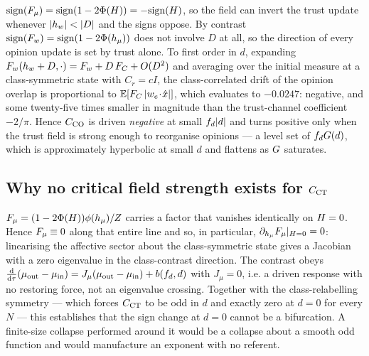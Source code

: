 $\mathrm{sign}(F_{\mu})=\mathrm{sign}(1-2\Phi(H))=-\mathrm{sign}(H)$, so the
field can invert the trust update whenever $|\hw|<|D|$ and the signs oppose. By
contrast $\mathrm{sign}(F_{w})=\mathrm{sign}(1-2\Phi(h_{\mu}))$ does not involve $D$
at all, so the direction of every opinion update is set by trust alone. To first
order in $d$, expanding $F_{w}(h_{w}+D,\cdot)=F_{w}+D\,F_{C}+O(D^2)$ and averaging over
the initial measure at a class-symmetric state with $C_r=cI$, the
class-correlated drift of the opinion overlap is proportional to
$\mathbb{E}[F_{C}\,|w_e\!\cdot\!\hat{x}|]$, which evaluates to $-0.0247$: negative,
and some twenty-five times smaller in magnitude than the trust-channel
coefficient $-2/\pi$. Hence $C_{\mathrm{CO}}$ is driven \emph{negative} at small $f_{d}|d|$ and
turns positive only when the trust field is strong enough to reorganise opinions
--- a level set of $f_{d}G(d)$, which is approximately hyperbolic at small $d$
and flattens as $G$ saturates.

\subsection{Why no critical field strength exists for $C_{\mathrm{CT}}$}
\label{app:no-critical}

$F_{\mu}=(1-2\Phi(H))\phi(h_{\mu})/Z$ carries a factor that vanishes identically on
$H=0$. Hence $F_{\mu}\equiv0$ along that entire line and so, in particular,
$\partial_{h_{\mu}}F_{\mu}|_{H=0}=0$: linearising the affective sector about the
class-symmetric state gives a Jacobian with a zero eigenvalue in the
class-contrast direction. The contrast obeys
$\tfrac{\mathrm{d}}{\mathrm{d}\tau}(\mu_{\text{out}}-\mu_{\text{in}}) =
J_\mu(\mu_{\text{out}}-\mu_{\text{in}}) + b(f_{d},d)$ with $J_\mu=0$, i.e. a driven
response with no restoring force, not an eigenvalue crossing. Together with the
class-relabelling symmetry --- which forces $C_{\mathrm{CT}}$ to be odd in $d$ and exactly
zero at $d=0$ for every $N$ --- this establishes that the sign change at $d=0$
cannot be a bifurcation. A finite-size collapse performed around it would be a
collapse about a smooth odd function and would manufacture an exponent with no
referent.
